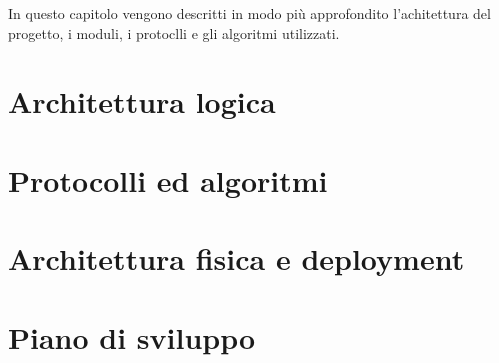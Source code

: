 \documentclass{memoir}
\begin{document}
In questo capitolo vengono descritti in modo più approfondito l'achitettura del progetto, i moduli, i protoclli e gli algoritmi utilizzati.

\section{Architettura logica}



\section{Protocolli ed algoritmi}
\section{Architettura fisica e deployment}
\section{Piano di sviluppo}


%
%
%
%
%
\end{document}
